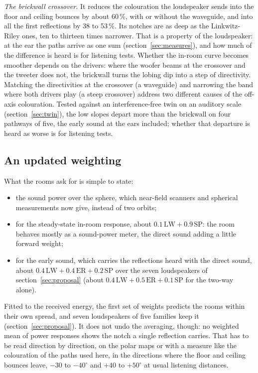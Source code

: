 \documentclass[11pt,a4paper]{article}
\begin{document}
\emph{The brickwall crossover.} It reduces the colouration the loudspeaker sends into the floor and
ceiling bounces by about 60\,\%, with or without the waveguide, and into all the first reflections by 38
to 53\,\%. Its notches are as deep as the Linkwitz-Riley ones, ten to thirteen times narrower. That is a
property of the loudspeaker: at the ear the paths arrive as one sum (section~\ref{sec:measures}), and
how much of the difference is heard is for listening tests. Whether the in-room curve becomes smoother depends
on the drivers: where the woofer beams at the crossover and the tweeter does not, the brickwall turns
the lobing dip into a step of directivity. Matching the directivities at the crossover (a waveguide)
and narrowing the band where both drivers play (a steep crossover) address two different causes of the
off-axis colouration. Tested against an interference-free twin on an auditory scale
(section~\ref{sec:twin}), the low slopes depart more than the brickwall on four pathways of five, the early
sound at the ears included; whether that departure is heard as worse is for listening tests.

\subsection{An updated weighting}

What the rooms ask for is simple to state:
\begin{itemize}
\item the sound power over the sphere, which near-field scanners and spherical measurements now give,
instead of two orbits;
\item for the steady-state in-room response, about $0.1\,\mathrm{LW} + 0.9\,\mathrm{SP}$: the room
behaves mostly as a sound-power meter, the direct sound adding a little forward weight;
\item for the early sound, which carries the reflections heard with the direct sound, about
$0.4\,\mathrm{LW} + 0.4\,\mathrm{ER} + 0.2\,\mathrm{SP}$ over the seven loudspeakers of
section~\ref{sec:proposal} (about $0.4\,\mathrm{LW} + 0.5\,\mathrm{ER} + 0.1\,\mathrm{SP}$ for the two-way alone).
\end{itemize}
Fitted to the received energy, the first set of weights predicts the rooms within their own spread, and
seven loudspeakers of five families keep it (section~\ref{sec:proposal}). It
does not undo the averaging, though: no weighted mean of power responses shows the notch a single
reflection carries. That has to be read direction by direction, on the polar maps or with a measure
like the colouration of the paths used here, in the directions where the floor and ceiling bounces
leave, $-30$ to $-40^\circ$ and $+40$ to $+50^\circ$ at usual listening distances.
\end{document}
